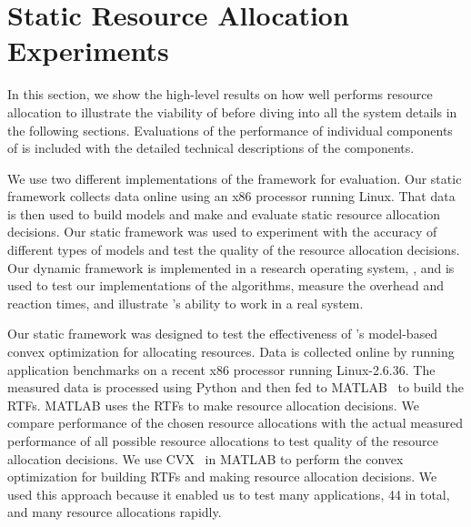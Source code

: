 \section{Static Resource Allocation Experiments}\label{eval-static}


In this section, we show the high-level results on how well \pacora performs resource allocation to illustrate the viability of \pacora before diving into all the system details in the following sections.   Evaluations of the performance of individual components of \pacora is included with the detailed technical descriptions of the components. 

We use two different implementations of the \pacora framework for evaluation. Our static framework collects data online using an x86 processor running Linux.  That data is then used to build models and make and evaluate static resource allocation decisions.  Our static framework was used to experiment with the accuracy of different types of models and test the quality of the resource allocation decisions.  Our dynamic framework is implemented in a research operating system, \tess, and is used to test our implementations of the algorithms, measure the overhead and reaction times, and illustrate \pacora's ability to work in a real system.

Our static framework was designed to test the effectiveness of \pacora's model-based convex optimization for allocating resources.  Data is collected online by running application benchmarks on a recent x86 processor running Linux-2.6.36.  The measured data is processed using Python and then fed to MATLAB~\cite{matlab} to build the RTFs.  MATLAB uses the RTFs to make resource allocation decisions.  We compare performance of the chosen resource allocations with the actual measured performance of all possible resource allocations to test quality of the resource allocation decisions. We use CVX~\cite{cvx} in MATLAB to perform the convex optimization for building RTFs and making resource allocation decisions.  We used this approach because it enabled us to test many applications, 44 in total, and many resource allocations rapidly. 

